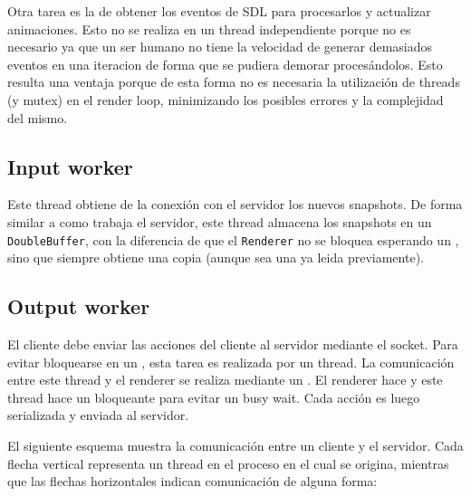 Otra tarea es la de obtener los eventos de SDL para procesarlos y actualizar animaciones. Esto no se realiza
en un thread independiente porque no es necesario ya que un ser humano no tiene la velocidad de generar demasiados
eventos en una iteracion de forma que se pudiera demorar proces\'andolos. Esto resulta una ventaja porque de esta
forma no es necesaria la utilizaci\'on de threads (y mutex) en el render loop, minimizando los posibles errores
y la complejidad del mismo.


\subsection{Input worker}

Este thread obtiene de la conexi\'on con el servidor los nuevos snapshots. De forma similar a como trabaja el servidor,
este thread almacena los snapshots en un \texttt{DoubleBuffer}, con la diferencia de que el \texttt{Renderer} no
se bloquea esperando un , sino que siempre obtiene una copia (aunque sea una ya leida previamente).


\subsection{Output worker}

El cliente debe enviar las acciones del cliente al servidor mediante el socket. Para evitar bloquearse en un ,
esta tarea es realizada por un thread. La comunicaci\'on entre este thread y el renderer se realiza mediante un
. El renderer hace  y este thread hace un  bloqueante para evitar un busy wait.
Cada acci\'on es luego serializada y enviada al servidor.


El siguiente esquema muestra la comunicaci\'on entre un cliente y el servidor. Cada flecha vertical representa un thread
en el proceso en el cual se origina, mientras que las flechas horizontales indican comunicaci\'on de alguna forma:

\begin{figure}
\begin{center}
\end{center}
\end{figure}



